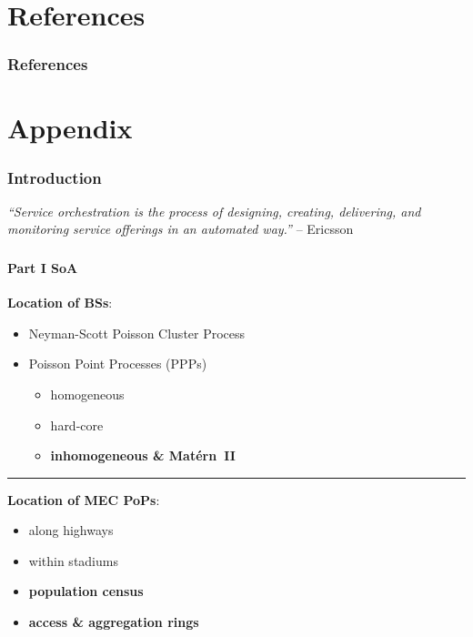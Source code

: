 \documentclass[aspectratio=169]{beamer}
\begin{document}
\section*{References}
\begin{frame}[allowframebreaks]
        \frametitle{References}
        \printbibliography[heading=none]
\end{frame}







\section*{Appendix}
\begin{frame}
    \frametitle{Introduction}

    \textit{``Service orchestration is the process of designing, creating, delivering, and monitoring service offerings in an automated way.''} -- Ericsson

\end{frame}

\begin{frame}
    \frametitle{\secname}
    \framesubtitle{Part I SoA}
    \textbf{Location of BSs}:
    \begin{itemize}
        \item Neyman-Scott Poisson Cluster Process~\cite{vinay-moller-interference}
        \item Poisson Point Processes (PPPs)~\cite{stochastic-martina}
            \begin{itemize}
                \item homogeneous~\cite{cran-vinay-moller,hetnets-cor}
                \item hard-core~\cite{hard-core-cover}
                \item {\color{red}\textbf{inhomogeneous \& Matérn~II}}
            \end{itemize}
    \end{itemize}
    \vfill
    \hrule
    \vfill
    \textbf{Location of MEC PoPs}:
    \begin{itemize}
        \item along highways~\cite{usa-mec}
        \item within stadiums~\cite{tokio-olympics}
        \item {\color{red}\textbf{population census}}
        \item {\color{red}\textbf{access \& aggregation rings}}
    \end{itemize}

\end{frame}
\end{document}
